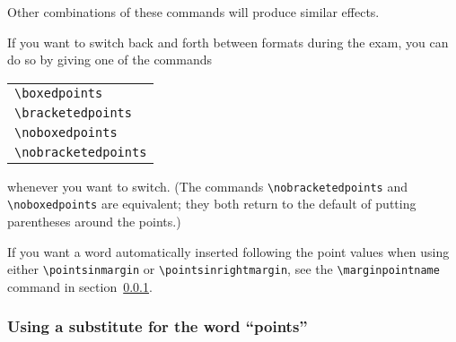 \documentclass[12pt]{exam}
\begin{document}
Other combinations of these commands will produce similar effects.

If you want to switch back and forth between formats during the exam,
you can do so by giving one of the commands
\begin{center}
  \begin{tabular}{l}
    \verb"\boxedpoints"\\
    \verb"\bracketedpoints"\\
    \verb"\noboxedpoints"\\
    \verb"\nobracketedpoints"
  \end{tabular}
\end{center}
whenever you want to switch.  (The commands
\verb"\nobracketedpoints" and \verb"\noboxedpoints" are equivalent;
they both return to the default of putting parentheses around the
points.)

If you want a word automatically inserted following the point values
when using either \verb"\pointsinmargin" or
\verb"\pointsinrightmargin", see the
  \verb"\marginpointname" command
in section~\ref{sec:pointname}.



\subsubsection{Using a substitute for the word ``points''}
\label{sec:pointname}
\end{document}
